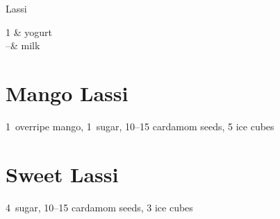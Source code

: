 
\begin{recipe}{Lassi}%
  \yield{}
  \source{}
  \maketitle

  \begin{ingredients2}
    1 \cup & yogurt\\
    \half--\twothird \cup & milk
  \end{ingredients2}

  \section{Mango Lassi}
  1~overripe mango, 1~\T sugar, 10--15 cardamom seeds, 5 ice cubes

  \section{Sweet Lassi}
  4~\T sugar, 10--15 cardamom seeds, 3 ice cubes
\end{recipe}


